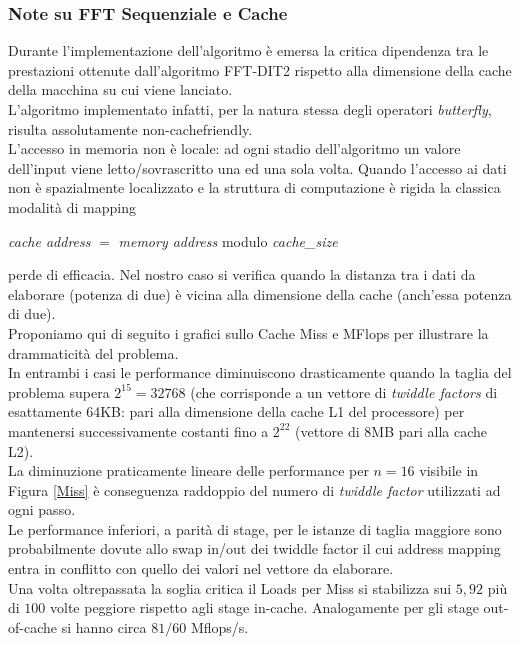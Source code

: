 \documentclass[12pt,a4paper,oneside,openright]{article}
\begin{document}
\subsubsection{Note su FFT Sequenziale e Cache}
Durante l'implementazione dell'algoritmo è emersa la critica dipendenza tra le prestazioni ottenute dall'algoritmo FFT-DIT2 rispetto alla dimensione della cache della macchina su cui viene lanciato.\\
L'algoritmo implementato infatti, per la natura stessa degli operatori \emph{butterfly}, risulta assolutamente non-cachefriendly.\\
L'accesso in memoria non è locale: ad ogni stadio dell'algoritmo un valore dell'input viene letto/sovrascritto una ed una sola volta. Quando l'accesso ai dati non è spazialmente localizzato e la struttura di computazione è rigida la classica modalità di mapping\\
\begin{center}
\emph{cache address} $=$ \emph{memory address} modulo \emph{cache\_size} 
\end{center}
perde di efficacia. Nel nostro caso si verifica quando la distanza tra i dati da elaborare (potenza di due) è vicina alla dimensione della cache (anch'essa potenza di due).\\
Proponiamo qui di seguito i grafici sullo Cache Miss e MFlops per illustrare la drammaticità del problema.\\
In entrambi i casi le performance diminuiscono drasticamente quando la taglia del problema supera $2^{15}=32768$ (che corrisponde a un vettore di \emph{twiddle factors} di esattamente 64KB: pari alla dimensione della cache L1 del processore) per mantenersi successivamente costanti fino a $2^{22}$ (vettore di 8MB pari alla cache L2).\\ La diminuzione praticamente lineare delle performance per $n=16$ visibile in Figura \ref{Miss} è conseguenza raddoppio del numero di \emph{twiddle factor} utilizzati ad ogni passo.\\
Le performance inferiori, a parità di stage, per le istanze di taglia maggiore sono probabilmente dovute allo swap in/out dei twiddle factor il cui address mapping entra in conflitto con quello dei valori nel vettore da elaborare.\\
Una volta oltrepassata la soglia critica il Loads per Miss si stabilizza sui $5,92$ più di $100$ volte peggiore rispetto agli stage in-cache. 
Analogamente per gli stage out-of-cache si hanno circa $81/60$ Mflops/s.
\end{document}
